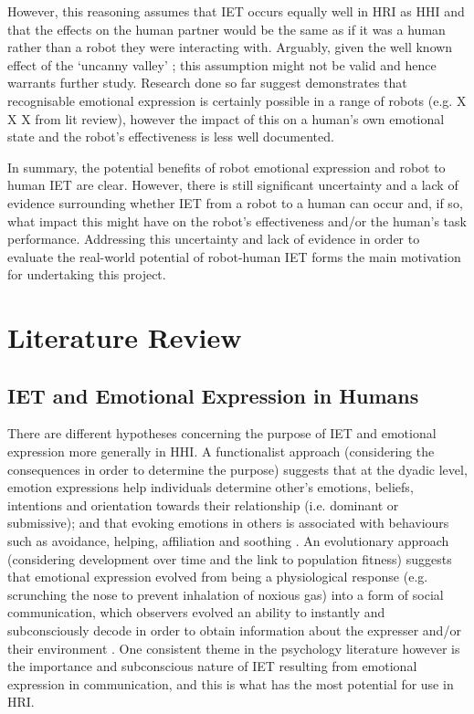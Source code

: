 \documentclass[11pt]{article}
\begin{document}
However, this reasoning assumes that IET occurs equally well in HRI as HHI and that the effects on the human partner would be the same as if it was a human rather than a robot they were interacting with. Arguably, given the well known effect of the `uncanny valley' \cite{mori2012uncanny}; this assumption might not be valid and hence warrants further study. Research done so far suggest demonstrates that recognisable emotional expression is certainly possible in a range of robots (e.g. X X X from lit review), however the impact of this on a human's own emotional state and the robot's effectiveness is less well documented. 

In summary, the potential benefits of robot emotional expression and robot to human IET are clear. However, there is still significant uncertainty and a lack of evidence surrounding whether IET from a robot to a human can occur  and, if so, what impact this might have on the robot's effectiveness and/or the human's task performance. Addressing this uncertainty and lack of evidence in order to evaluate the real-world potential of robot-human IET forms the main motivation for undertaking this project. 

\section{Literature Review}
\subsection{IET and Emotional Expression in Humans}
There are different hypotheses concerning the purpose of IET and emotional expression more generally in HHI. A functionalist approach (considering the consequences in order to determine the purpose) suggests that at the dyadic level, emotion expressions help individuals determine other's emotions, beliefs, intentions and orientation towards their relationship (i.e. dominant or submissive); and that evoking emotions in others is associated with behaviours such as avoidance, helping, affiliation and soothing \cite{keltner1999social}. An evolutionary approach (considering development over time and the link to population fitness) suggests that emotional expression evolved from being a physiological response (e.g. scrunching the nose to prevent inhalation of noxious gas) into a form of social communication, which observers evolved an ability to instantly and subconsciously decode in order to obtain information about the expresser and/or their environment \cite{shariff2011emotion}. One consistent theme in the psychology literature however is the importance and subconscious nature of IET resulting from emotional expression in communication, and this is what has the most potential for use in HRI. 
\end{document}
